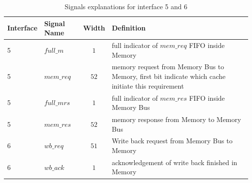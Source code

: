 \documentclass[12pt,frontmatter,copyright,thesis]{usfmanus}
\begin{document}
\begin{table}[h]
\caption{Signals explanations for interface 5 and 6}

\begin{tabular}{|l|l|c | p{9cm} |}
\hline
Interface & Signal Name & Width & Definition \\
\hline
\hline
5	 &	$full\_m$ 			&$1$				& full indicator of $mem\_req$ FIFO inside Memory\\
\hline
5	 &	$mem\_req$ 			&$52$			& memory request from Memory Bus to Memory, first bit indicate which cache initiate this requirement\\
\hline
5	 &	$full\_mrs$ 			&$1$				& full indicator of $mem\_res$ FIFO inside Memory Bus\\
\hline
5	 &	$mem\_res$ 			&$52$			& memory response from Memory to Memory Bus \\
\hline

6	 &	$wb\_req$ 			&$51$			& Write back request from Memory Bus to Memory\\
\hline
6	 &	$wb\_ack$ 			&$1$				& acknowledgement of write back finished in Memory\\

\hline
\end{tabular}
\label{int3t}
\end{table}

%
%
\end{document}
